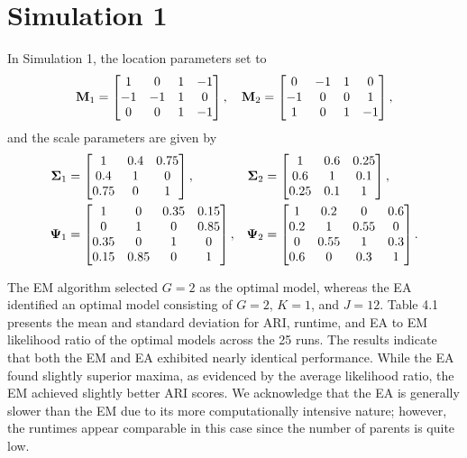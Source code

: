 \documentclass[12pt]{report}
\begin{document}
\section{Simulation 1}
In Simulation 1, the location parameters set to
$$
{\bf M}_1 =
\begin{bmatrix} 
1  &  0 & 1  & -1 \\
-1 & -1 &  1 & 0\\
 0 & 0  & 1 & -1
\end{bmatrix}, \quad 
{\bf M}_2 =
\begin{bmatrix} 
0  &  -1 & 1  & 0 \\
-1 & 0 &  0 & 1\\
 1 & 0  & 1 & -1
\end{bmatrix},
$$
and the scale parameters are given by
\begin{align*}
{\bf \Sigma}_1 &=
\begin{bmatrix} 
1  &  0.4 & 0.75   \\
0.4 & 1 &  0\\
 0.75 & 0  & 1 
\end{bmatrix}, & 
{\bf \Sigma}_2 &=
\begin{bmatrix} 
1 &  0.6 & 0.25  \\
0.6 & 1 &  0.1 \\
 0.25 & 0.1  & 1 
\end{bmatrix},
\\
{\bf \Psi}_1 &=
\begin{bmatrix} 
      1  &      0 &   0.35  & 0.15 \\
      0 &       1 &    0      & 0.85\\
 0.35 &       0  &   1      & 0\\
 0.15 &   0.85  &   0     & 1
\end{bmatrix}, & 
{\bf \Psi}_2 &=
\begin{bmatrix} 
      1  &      0.2 &     0  & 0.6 \\
      0.2 &       1 &       0.55      & 0\\
      0 &        0.55  &   1      & 0.3\\
   0.6 &       0  &             0.3     & 1
\end{bmatrix}.
\end{align*}

The EM algorithm selected $G=2$ as the optimal model, whereas the EA identified an optimal model consisting of $G=2$, $K=1$, and $J=12$. Table 4.1 presents the mean and standard deviation for ARI, runtime, and EA to EM likelihood ratio of the optimal models across the 25 runs. The results indicate that both the EM and EA exhibited nearly identical performance. While the EA found slightly superior maxima, as evidenced by the average likelihood ratio, the EM achieved slightly better ARI scores. We acknowledge that the EA is generally slower than the EM due to its more computationally intensive nature; however, the runtimes appear comparable in this case since the number of parents is quite low.
\end{document}
